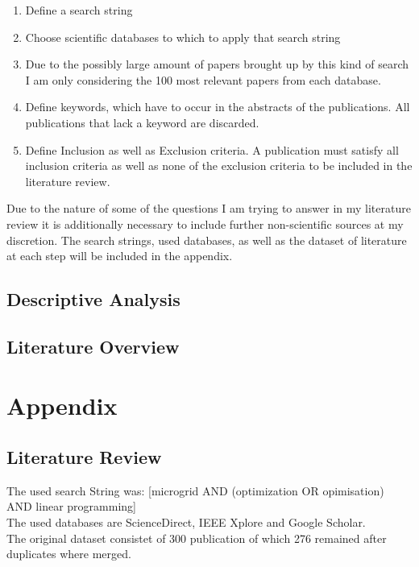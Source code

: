 \documentclass[
	11pt,								%
	DIV10,								%
	a4paper,         					%
	oneside,							%
	headheight=20pt,					%
	footheight=20pt,					%
    parskip=full,						%
    listof=totoc,						%
	bibliography=totoc,					%
	index=totoc,						%
]{scrartcl}
\begin{document}
\begin{enumerate}
	\item Define a search string
	\item Choose scientific databases to which to apply that search string
	\item Due to the possibly large amount of papers brought up by this kind of search I am only considering the 100 most relevant papers from each database.
	\item Define keywords, which have to occur in the abstracts of the publications. All publications that lack a keyword are discarded.
	\item Define Inclusion as well as Exclusion criteria. A publication must satisfy all inclusion criteria as well as none of the exclusion criteria to be included in the literature review.
\end{enumerate}
Due to the nature of some of the questions I am trying to answer in my literature review it is additionally necessary to include further non-scientific sources at my discretion.
The search strings, used databases, as well as the dataset of literature at each step will be included in the appendix. 

\subsection{Descriptive Analysis}


\subsection{Literature Overview}


\newpage
\newpage

\section{Appendix}
\subsection{Literature Review}
The used search String was:  [microgrid AND (optimization OR opimisation) AND linear programming]
\\
The used databases are ScienceDirect, IEEE Xplore and Google Scholar.
\\
The original dataset consistet of 300 publication of which 276 remained after duplicates where merged.
\\


\renewcommand\refname{References}			%
\printbibliography
\end{document}
